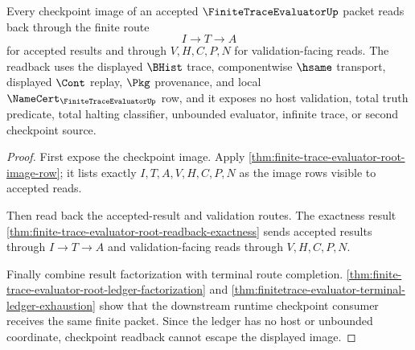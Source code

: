 \begin{theorem}
\label{thm:finite-trace-evaluator-checkpoint-image-readback}
Every checkpoint image of an accepted $\FiniteTraceEvaluatorUp$ packet reads
back through the finite route
$$
I \to T \to A
$$
for accepted results and through $V,H,C,P,N$ for validation-facing reads. The
readback uses the displayed $\BHist$ trace, componentwise $\hsame$ transport,
displayed $\Cont$ replay, $\Pkg$ provenance, and local
$\NameCert_{\FiniteTraceEvaluatorUp}$ row, and it exposes no host validation,
total truth predicate, total halting classifier, unbounded evaluator, infinite
trace, or second checkpoint source.
\end{theorem}
\begin{proof}
First expose the checkpoint image. Apply
\autoref{thm:finite-trace-evaluator-root-image-row}; it lists exactly
$I,T,A,V,H,C,P,N$ as the image rows visible to accepted reads.

Then read back the accepted-result and validation routes. The exactness result
\autoref{thm:finite-trace-evaluator-root-readback-exactness} sends accepted
results through $I \to T \to A$ and validation-facing reads through
$V,H,C,P,N$.

Finally combine result factorization with terminal route completion.
\autoref{thm:finite-trace-evaluator-root-ledger-factorization} and
\autoref{thm:finitetrace-evaluator-terminal-ledger-exhaustion} show that the
downstream runtime checkpoint consumer receives the same finite packet. Since
the ledger has no host or unbounded coordinate, checkpoint readback cannot
escape the displayed image.
\end{proof}

